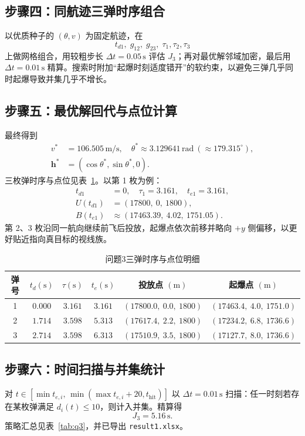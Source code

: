 \documentclass[withoutpreface,bwprint]{cumcmthesis}
\begin{document}
\subsection{步骤四：同航迹三弹时序组合}
以优质种子的 $(\theta,v)$ 为固定航迹，在
\[
t_{d1},\; g_{12},\; g_{23},\; \tau_1,\tau_2,\tau_3
\]
上做网格组合，用较粗步长 $\Delta t=0.05\,\mathrm{s}$ 评估 $J_3$；再对最优解邻域加密，最后用 $\Delta t=0.01\,\mathrm{s}$ 精算。搜索时附加“起爆时刻适度错开”的软约束，以避免三弹几乎同时起爆导致并集几乎不增长。

\subsection{步骤五：最优解回代与点位计算}
最终得到
\begin{align}
v^\ast&=106.505\,\mathrm{m/s},\quad
\theta^\ast\approx 3.129641\,\mathrm{rad}\ (\approx 179.315^\circ),\\
\mathbf{h}^\ast&=(\cos\theta^\ast,\sin\theta^\ast,0).
\end{align}
三枚弹时序与点位见表~\ref{tab:q3-detail}。以第 1 枚为例：
\begin{align}
t_{d1}&=0,\quad \tau_1=3.161,\quad t_{e1}=3.161,\\
U(t_{d1})&=(17800,\ 0,\ 1800),\\
B(t_{e1})&\approx(17463.39,\ 4.02,\ 1751.05).
\end{align}
第 2、3 枚沿同一航向继续前飞后投放，起爆点依次前移并略向 $+y$ 侧偏移，以更好贴近指向真目标的视线族。

\begin{table}[!htbp]
\centering
\caption{问题3三弹时序与点位明细}
\label{tab:q3-detail}
\begin{tabular}{cccccc}
\toprule[1.5pt]
弹号 & $t_d(\mathrm{s})$ & $\tau(\mathrm{s})$ & $t_e(\mathrm{s})$ & 投放点 $(\mathrm{m})$ & 起爆点 $(\mathrm{m})$ \\
\midrule[1pt]
1 & $0.000$ & $3.161$ & $3.161$ & $(17800.0,\ 0.0,\ 1800)$ & $(17463.4,\ 4.0,\ 1751.0)$ \\
2 & $1.714$ & $3.598$ & $5.313$ & $(17617.4,\ 2.2,\ 1800)$ & $(17234.2,\ 6.8,\ 1736.6)$ \\
3 & $2.714$ & $3.598$ & $6.313$ & $(17510.9,\ 3.5,\ 1800)$ & $(17127.7,\ 8.0,\ 1736.6)$ \\
\bottomrule[1.5pt]
\end{tabular}
\end{table}

\subsection{步骤六：时间扫描与并集统计}
对 $t\in[\min t_{e,i},\,\min(\max t_{e,i}+20,t_{\mathrm{hit}})]$ 以 $\Delta t=0.01\,\mathrm{s}$ 扫描：任一时刻若存在某枚弹满足 $d_i(t)\le 10$，则计入并集。精算得
\begin{equation}
J_3=5.16\,\mathrm{s}.
\end{equation}
策略汇总见表~\ref{tab:q3}，并已导出 \texttt{result1.xlsx}。
\end{document}
